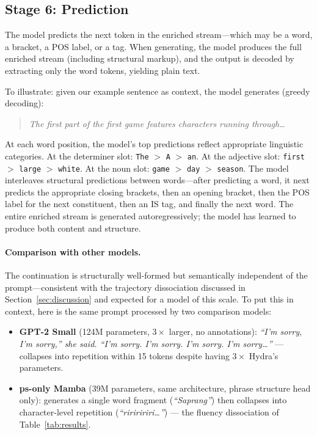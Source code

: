 \documentclass[11pt]{article}
\begin{document}
\subsection*{Stage 6: Prediction}

The model predicts the next token in the enriched stream---which 
may be a word, a bracket, a POS label, or a tag. When generating, 
the model produces the full enriched stream (including structural 
markup), and the output is decoded by extracting only the word 
tokens, yielding plain text.

To illustrate: given our example sentence as context, the model 
generates (greedy decoding):

\begin{quote}
\small
\emph{The first part of the first game features characters running 
through\ldots}
\end{quote}

At each word position, the model's top predictions reflect 
appropriate linguistic categories. At the determiner slot: 
\texttt{The} $>$ \texttt{A} $>$ \texttt{an}. At the adjective 
slot: \texttt{first} $>$ \texttt{large} $>$ \texttt{white}. At 
the noun slot: \texttt{game} $>$ \texttt{day} $>$ \texttt{season}. 
The model interleaves structural predictions between words---after 
predicting a word, it next predicts the appropriate closing 
brackets, then an opening bracket, then the POS label for the 
next constituent, then an IS tag, and finally the next word. The 
entire enriched stream is generated autoregressively; the model 
has learned to produce both content and structure.

\paragraph{Comparison with other models.}
The continuation is structurally well-formed but semantically 
independent of the prompt---consistent with the trajectory 
dissociation discussed in Section~\ref{sec:discussion} and expected 
for a model of this scale. To put this in context, here is the same 
prompt processed by two comparison models:

\begin{itemize}
\item \textbf{GPT-2 Small} (124M parameters, $3\times$ larger, no 
annotations): \emph{``I'm sorry, I'm sorry,'' she said. ``I'm sorry. 
I'm sorry. I'm sorry. I'm sorry\ldots''} --- collapses into 
repetition within 15 tokens despite having $3\times$ Hydra's 
parameters.

\item \textbf{ps-only Mamba} (39M parameters, same architecture, 
phrase structure head only): generates a single word fragment 
(\emph{``Saprang''}) then collapses into character-level repetition 
(\emph{``ririririri\ldots''}) --- the fluency dissociation of 
Table~\ref{tab:results}.
\end{itemize}
\end{document}
